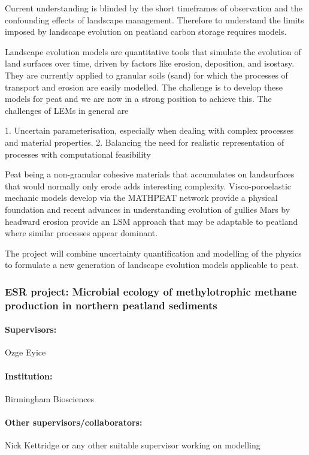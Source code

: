 \documentclass[12pt]{article}
\begin{document}
Current understanding is blinded by the short timeframes of observation and the confounding effects of landscape management.  Therefore to understand the limits imposed by landscape evolution on peatland carbon storage requires models.  

Landscape evolution models are quantitative tools that simulate the evolution of land surfaces over time, driven by factors like erosion, deposition, and isostasy.  They are currently applied to granular soils (sand) for which the processes of transport and erosion are easily modelled.  The challenge is to develop these models for peat and we are now in a strong position to achieve this.  The challenges of LEMs in general are

1. Uncertain parameterisation, especially when dealing with complex processes and material properties. 
2. Balancing the need for realistic representation of processes with computational feasibility

Peat being a non-granular cohesive materials that accumulates on landsurfaces that would normally only erode adds interesting complexity.  Visco-poroelastic mechanic models develop via the MATHPEAT network provide a physical foundation and recent advances in understanding evolution of gullies Mars by headward erosion provide an LSM approach that may be adaptable to peatland where similar processes appear dominant.

The project will combine uncertainty quantification and modelling of the physics to formulate a new generation of landscape evolution models applicable to peat.  



\subsubsection*{ESR project: Microbial ecology of methylotrophic methane production in northern peatland sediments}
\paragraph{Supervisors:} Ozge Eyice
\paragraph{Institution:} Birmingham Biosciences
\paragraph{Other supervisors/collaborators:} Nick Kettridge  or any other suitable supervisor working on modelling
\end{document}
